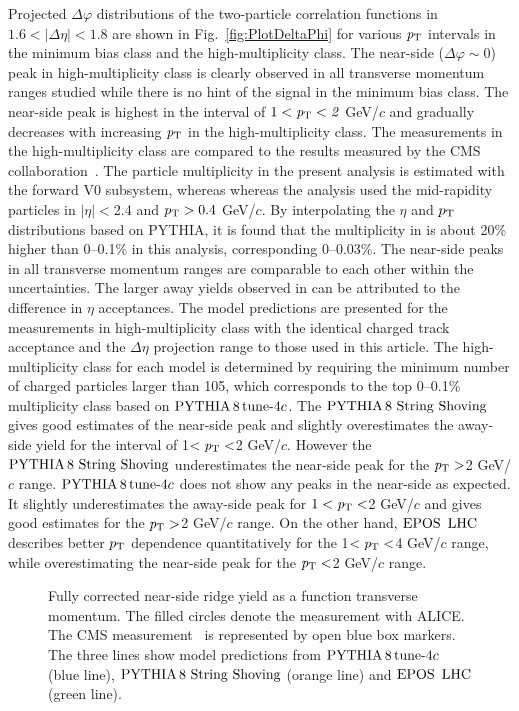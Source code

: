 Projected $\Delta\varphi$ distributions of the two-particle correlation functions in $1.6<|\Delta\eta|<1.8$ are shown in Fig.~\ref{fig:PlotDeltaPhi} for various $\it{p}_{\rm{T}}$ intervals in the minimum bias class and the high-multiplicity class. The near-side ($\Delta\varphi\sim 0$) peak in high-multiplicity class is clearly observed in all transverse momentum ranges studied while there is no hint of the signal in the minimum bias class. The near-side peak is highest in the interval of $1<\it{p}_{\rm{T}}<2$ GeV/$c$ and gradually decreases with increasing $\it{p}_{\rm{T}}$ in the high-multiplicity class. The measurements in the high-multiplicity class are compared to the results measured by the CMS collaboration~\cite{Khachatryan:2015lva}. The particle multiplicity in the present analysis is estimated with the forward V0 subsystem, whereas whereas the analysis \cite{Khachatryan:2015lva}  used the mid-rapidity particles in $|\eta|<$2.4 and $p_\mathrm{T}>0.4$ GeV/$c$. By interpolating the $\eta$ and $p_\mathrm{T}{}$ distributions based on PYTHIA, it is found that the multiplicity in \cite{Khachatryan:2015lva} is about 20\% higher than 0--0.1\% in this analysis, corresponding 0--0.03\%. The near-side peaks in all transverse momentum ranges are comparable to each other within the uncertainties. The larger away yields observed in \cite{Khachatryan:2015lva} can be attributed to the difference in $\eta$ acceptances. The model predictions are presented for the measurements in high-multiplicity class with the identical charged track acceptance and the $\Delta\eta$ projection range to those used in this article. The high-multiplicity class for each model is determined by requiring the minimum number of charged particles larger than 105, which corresponds to the top 0--0.1\% multiplicity class based on $\mathrm{PYTHIA}\,8\,\mathrm{tune}{\text -}4c$. The ${\mathrm{PYTHIA}\,8~\mathrm{String}~}\mathrm{Shoving}$ gives good estimates of the near-side peak and slightly overestimates the away-side yield for the interval of 1$<\it{p}_{\rm{T}}<$2 GeV/$c$. However the ${\mathrm{PYTHIA}\,8~\mathrm{String}~}\mathrm{Shoving}$ underestimates the near-side peak for the $\it{p}_{\rm{T}}>$2 GeV/$c$ range. $\mathrm{PYTHIA}\,8\,\mathrm{tune}{\text -}4c$ does not show any peaks in the near-side as expected. It slightly underestimates the away-side peak for $1<\it{p}_{\rm{T}}<$2 GeV/$c$ and gives good estimates for the $\it{p}_{\rm{T}}>$2 GeV/$c$ range. On the other hand, ${\mathrm{EPOS}\,~\mathrm{LHC}}$ describes better $p_\mathrm{T}$ dependence quantitatively for the 1$<\it{p}_{\rm{T}}<$4 GeV/$c$ range, while overestimating the near-side peak for the $\it{p}_{\rm{T}}<$2 GeV/$c$ range. 


\begin{figure}[h!]
	\centering
	\caption{ Fully corrected near-side ridge yield as a function transverse momentum. The filled circles denote the measurement with ALICE. The CMS measurement~\cite{Khachatryan:2015lva} is represented by open blue box markers. The three lines show model predictions from $\mathrm{PYTHIA}\,8\,\mathrm{tune}{\text -}4c$ (blue line), ${\mathrm{PYTHIA}\,8~\mathrm{String}~}\mathrm{Shoving}$ (orange line) and ${\mathrm{EPOS}\,~\mathrm{LHC}}$ (green line).}
	\label{fig:PlotYSpect}
\end{figure}

